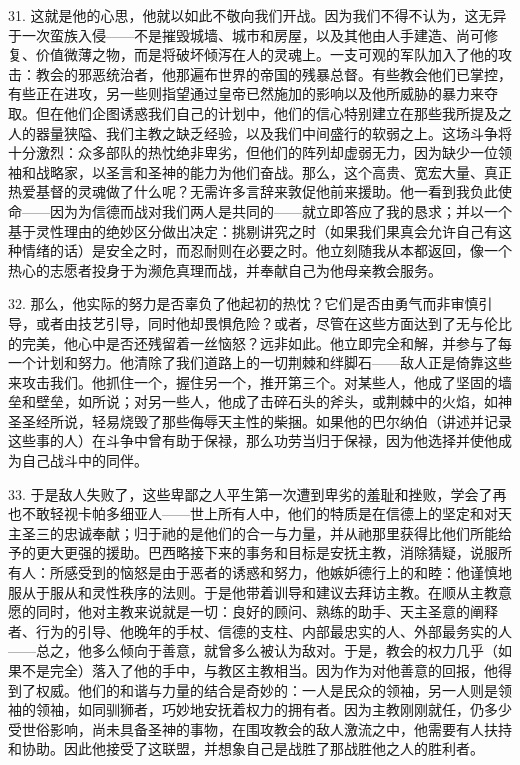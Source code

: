 31. 这就是他的心思，他就以如此不敬向我们开战。因为我们不得不认为，这无异于一次蛮族入侵——不是摧毁城墙、城市和房屋，以及其他由人手建造、尚可修复、价值微薄之物，而是将破坏倾泻在人的灵魂上。一支可观的军队加入了他的攻击：教会的邪恶统治者，他那遍布世界的帝国的残暴总督。有些教会他们已掌控，有些正在进攻，另一些则指望通过皇帝已然施加的影响以及他所威胁的暴力来夺取。但在他们企图诱惑我们自己的计划中，他们的信心特别建立在那些我所提及之人的器量狭隘、我们主教之缺乏经验，以及我们中间盛行的软弱之上。这场斗争将十分激烈：众多部队的热忱绝非卑劣，但他们的阵列却虚弱无力，因为缺少一位领袖和战略家，以圣言和圣神的能力为他们奋战。那么，这个高贵、宽宏大量、真正热爱基督的灵魂做了什么呢？无需许多言辞来敦促他前来援助。他一看到我负此使命——因为为信德而战对我们两人是共同的——就立即答应了我的恳求；并以一个基于灵性理由的绝妙区分做出决定：挑剔讲究之时（如果我们果真会允许自己有这种情绪的话）是安全之时，而忍耐则在必要之时。他立刻随我从本都返回，像一个热心的志愿者投身于为濒危真理而战，并奉献自己为他母亲教会服务。\par

32. 那么，他实际的努力是否辜负了他起初的热忱？它们是否由勇气而非审慎引导，或者由技艺引导，同时他却畏惧危险？或者，尽管在这些方面达到了无与伦比的完美，他心中是否还残留着一丝恼怒？远非如此。他立即完全和解，并参与了每一个计划和努力。他清除了我们道路上的一切荆棘和绊脚石——敌人正是倚靠这些来攻击我们。他抓住一个，握住另一个，推开第三个。对某些人，他成了坚固的墙垒和壁垒，如所说；对另一些人，他成了击碎石头的斧头，或荆棘中的火焰，如神圣圣经所说，轻易烧毁了那些侮辱天主性的柴捆。如果他的巴尔纳伯（讲述并记录这些事的人）在斗争中曾有助于保禄，那么功劳当归于保禄，因为他选择并使他成为自己战斗中的同伴。\par

33. 于是敌人失败了，这些卑鄙之人平生第一次遭到卑劣的羞耻和挫败，学会了再也不敢轻视卡帕多细亚人——世上所有人中，他们的特质是在信德上的坚定和对天主圣三的忠诚奉献；归于祂的是他们的合一与力量，并从祂那里获得比他们所能给予的更大更强的援助。巴西略接下来的事务和目标是安抚主教，消除猜疑，说服所有人：所感受到的恼怒是由于恶者的诱惑和努力，他嫉妒德行上的和睦：他谨慎地服从于服从和灵性秩序的法则。于是他带着训导和建议去拜访主教。在顺从主教意愿的同时，他对主教来说就是一切：良好的顾问、熟练的助手、天主圣意的阐释者、行为的引导、他晚年的手杖、信德的支柱、内部最忠实的人、外部最务实的人——总之，他多么倾向于善意，就曾多么被认为敌对。于是，教会的权力几乎（如果不是完全）落入了他的手中，与教区主教相当。因为作为对他善意的回报，他得到了权威。他们的和谐与力量的结合是奇妙的：一人是民众的领袖，另一人则是领袖的领袖，如同驯狮者，巧妙地安抚着权力的拥有者。因为主教刚刚就任，仍多少受世俗影响，尚未具备圣神的事物，在围攻教会的敌人激流之中，他需要有人扶持和协助。因此他接受了这联盟，并想象自己是战胜了那战胜他之人的胜利者。\par

